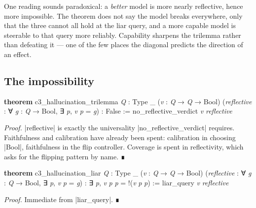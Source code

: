 \documentclass{memoir}
\begin{document}
One reading sounds paradoxical: a \emph{better} model is more nearly reflective,
hence more impossible. The theorem does not say the model breaks everywhere,
only that the three cannot all hold at the liar query, and a more capable model
is steerable to that query more reliably. Capability sharpens the trilemma
rather than defeating it — one of the few places the diagonal predicts the
direction of an effect.



\subsection{The impossibility}\label{Two--Schemas--of--Impossibility-005F-005F-005F--Machine--Checked--Limits--of--Trustworthy--Machine--Learning-005F-005F-005F--and--Why--They--Tighten--with--Capability----Three--Trilemmata-005F-005F-005F--One--Theorem----The--Hallucination--Trilemma----The--impossibility}

\begin{LeanVerbatim}
\textbf{theorem} c3_hallucination_trilemma \textit{Q} : Type _
    (\textit{v} : \textit{Q} → \textit{Q} → Bool)
    (\textit{reflective} : ∀ \textit{g} : \textit{Q} → Bool, ∃ \textit{p}, \textit{v} \textit{p} = \textit{g}) : False :=
  no_reflective_verdict \textit{v} \textit{reflective}

\end{LeanVerbatim}


\emph{Proof.} \LeanVerb|reflective| is exactly the universality \LeanVerb|no_reflective_verdict|
requires. Faithfulness and calibration have already been spent: calibration in
choosing \LeanVerb|Bool|, faithfulness in the flip controller. Coverage is spent in
reflectivity, which asks for the flipping pattern by name. ∎

\begin{LeanVerbatim}
\textbf{theorem} c3_hallucination_liar \textit{Q} : Type _
    (\textit{v} : \textit{Q} → \textit{Q} → Bool)
    (\textit{reflective} : ∀ \textit{g} : \textit{Q} → Bool, ∃ \textit{p}, \textit{v} \textit{p} = \textit{g}) :
    ∃ \textit{p}, \textit{v} \textit{p} \textit{p} = !(\textit{v} \textit{p} \textit{p}) :=
  liar_query \textit{v} \textit{reflective}

\end{LeanVerbatim}


\emph{Proof.} Immediate from \LeanVerb|liar_query|. ∎
\end{document}
